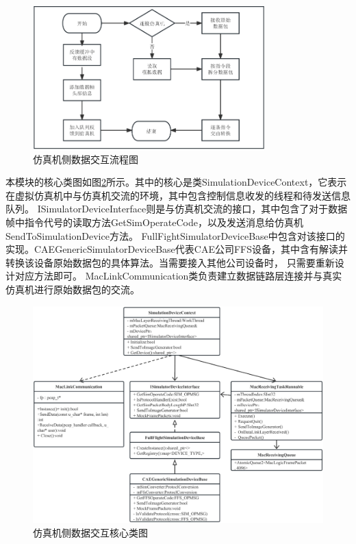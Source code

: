 \begin{figure}[h!]
    \begin{center}
        \includegraphics[width=0.8\textwidth]{pictures/flowchart1.pdf}
        \caption{仿真机侧数据交互流程图}
        \label{module11}
    \end{center}
\end{figure}
\par
本模块的核心类图如图\ref{module12}所示。其中的核心是类SimulationDeviceContext，它表示在虚拟仿真机中与仿真机交流的环境，其中包含控制信息收发的线程和待发送信息队列。
ISimulatorDeviceInterface则是与仿真机交流的接口，其中包含了对于数据帧中指令代号的读取方法GetSimOperateCode，以及发送消息给仿真机SendToSimulationDevice方法。
FullFightSimulatorDeviceBase中包含对该接口的实现。CAEGenericSimulatorDeviceBase代表CAE公司FFS设备，其中含有解读并转换该设备原始数据包的具体算法。当需要接入其他公司设备时，
只需要重新设计对应方法即可。
MacLinkCommunication类负责建立数据链路层连接并与真实仿真机进行原始数据包的交流。
\begin{figure}[h!]
    \begin{center}
        \includegraphics[width=\textwidth]{pictures/classdiagram1.pdf}
        \caption{仿真机侧数据交互核心类图}
        \label{module12}
    \end{center}
\end{figure}

